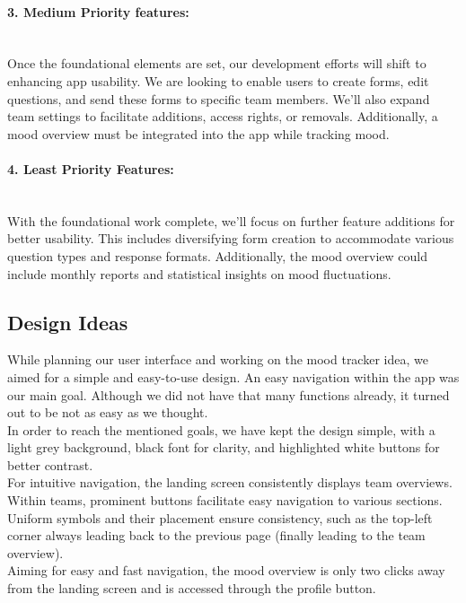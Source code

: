 \documentclass[11pt]{article}
\begin{document}
    \paragraph{3. Medium Priority features:} \mbox{} \\
    Once the foundational elements are set, our development efforts will shift to enhancing app usability. We are looking to enable users to create forms, edit questions, and send these forms to specific team members. We'll also expand team settings to facilitate additions, access rights, or removals. Additionally, a mood overview must be integrated into the app while tracking mood.
    
    \paragraph{4. Least Priority Features:} \mbox{} \\
    With the foundational work complete, we'll focus on further feature additions for better usability. This includes diversifying form creation to accommodate various question types and response formats. Additionally, the mood overview could include monthly reports and statistical insights on mood fluctuations.
    


\subsection{Design Ideas}
While planning our user interface and working on the mood tracker idea, we aimed for a simple and easy-to-use design. An easy navigation within the app was our main goal. Although we did not have that many functions already, it turned out to be not as easy as we thought.\\
In order to reach the mentioned goals, we have kept the design simple, with a light grey background, black font for clarity, and highlighted white buttons for better contrast. \\
For intuitive navigation, the landing screen consistently displays team overviews. Within teams, prominent buttons facilitate easy navigation to various sections. Uniform symbols and their placement ensure consistency, such as the top-left corner always leading back to the previous page (finally leading to the team overview).\\
Aiming for easy and fast navigation, the mood overview is only two clicks away from the landing screen and is accessed through the profile button. 
\end{document}
